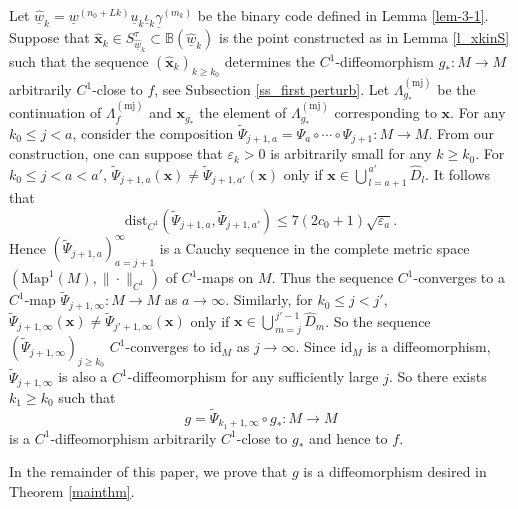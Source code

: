 \documentclass{amsart}
\theoremstyle{plain}
\theoremstyle{definition}
\numberwithin{equation}{section}
\numberwithin{figure}{section}
\def\bb{\mathbb{B}}
\def\bx{{\boldsymbol{x}}}
\def\wh{\widehat}
\def\wt{\widetilde}
\def\too{\longrightarrow}
\def\ve{\varepsilon}
\def\ul{\underline}
\begin{document}
Let $\underline{\widehat w}_k=\underline{w}^{(n_0+Lk)}\underline{u}_k\underline{\iota}_k\underline{\gamma}^{(m_k)}$ be the binary code defined in Lemma \ref{lem-3-1}.
Suppose that $\wh\bx_k\in S_{\wh{\ul{w}}_k}^\tau\subset \bb(\wh{\ul{w}}_k)$ is  the point constructed as in Lemma \ref{l_xkinS} such that the sequence $(\wh\bx_k)_{k\geq k_0}$ determines the $C^1$-diffeomorphism $g_*:M\too M$ arbitrarily $C^1$-close to $f$, 
see Subsection \ref{ss_first perturb}.
Let $\Lambda_{g_*}^{(\mathrm{mj})}$ be the continuation of $\Lambda_{f}^{(\mathrm{mj})}$ 
and $\bx_{g_*}$ the element of $\Lambda_{g_*}^{(\mathrm{mj})}$ corresponding to $\bx$.
For any $k_0\leq j<a$, consider the composition 
$\wt \varPsi_{j+1,a}=\varPsi_a\circ\cdots\circ \varPsi_{j+1}:M\too M$.
From our construction, one can suppose that $\ve_k>0$ is arbitrarily small for any $k\geq k_0$. 
For $k_0\leq j<a<a'$, $\wt\varPsi_{j+1,a}(\bx)\neq \wt\varPsi_{j+1,a'}(\bx)$ only  if 
$\bx\in \bigcup_{\,l=a+1}^{\,a'}\wh D_l$.
It follows that
\[
\mathrm{dist}_{C^1}(\wt \varPsi_{j+1,a},\wt \varPsi_{j+1,a'})\leq 7(2c_0+1)\sqrt{\ve_a}.\]
Hence $(\wt\varPsi_{j+1,a})_{a=j+1}^\infty$ is a Cauchy sequence 
in the complete metric space $(\mathrm{Map}^1(M),\|\cdot\|_{C^1})$ of $C^1$-maps on $M$.
Thus the sequence $C^1$-converges to a $C^1$-map  
$\wt\varPsi_{j+1,\infty}:M\too M$ as $a\to \infty$.
Similarly, for $k_0\leq j<j'$, $\wt\varPsi_{j+1,\infty}(\bx)\neq \wt\varPsi_{j'+1,\infty}(\bx)$ only  if 
$\bx\in \bigcup_{\,m=j}^{\,j'-1}\wh D_m$.
So the sequence $(\wt\varPsi_{j+1,\infty})_{j\geq k_0}$ $C^1$-converges to $\mathrm{id}_M$ as $j\to \infty$.
Since $\mathrm{id}_M$ is a diffeomorphism, $\wt\varPsi_{j+1,\infty}$ is also a $C^1$-diffeomorphism for any sufficiently large $j$.
So there exists $k_1\geq k_0$ such that 
\begin{equation}\label{eqn_def_g}
g=\wt\varPsi_{k_1+1,\infty}\circ g_*:M\too M
\end{equation}
is a $C^1$-diffeomorphism arbitrarily $C^1$-close to $g_*$ and hence to $f$.


In the remainder of this paper, we prove that $g$ is a diffeomorphism 
desired in Theorem \ref{mainthm}.
\end{document}
